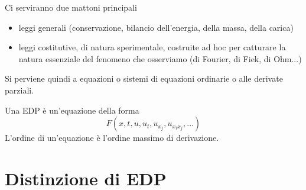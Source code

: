 \documentclass[10pt,a4paper,twoside,openright]{book}
\begin{document}
Ci serviranno due mattoni principali
\begin{itemize}
\item leggi generali (conservazione, bilancio dell'energia, della massa, della carica)
\item leggi costitutive, di natura sperimentale, costruite ad hoc per catturare la natura essenziale del fenomeno che osserviamo (di Fourier, di Fiek, di Ohm...)
\end{itemize}

Si perviene quindi a equazioni o sistemi di equazioni ordinarie o alle derivate parziali.

Una EDP è un'equazione della forma
\begin{equation*}
F( x,t,u,u_{t},u_{x_{j}},u_{x_{i} x_{j}},\dotsc)
\end{equation*}
L'ordine di un'equazione è l'ordine massimo di derivazione.
\section{Distinzione di EDP}
\end{document}
